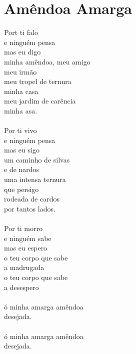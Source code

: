 \documentclass{article}
\begin{document}
\section{ Amêndoa Amarga}
Port ti falo\\
e ninguém pensa\\
mas eu digo\\
minha amêndoa, meu amigo\\
meu irmão\\
meu tropel de ternura\\
minha casa\\
meu jardim de carência\\
minha asa.\\
\\
Por ti vivo\\
e ninguém pensa\\
mas eu sigo\\
um caminho de silvas\\
e de nardos\\
uma intensa ternura\\
que persigo\\
rodeada de cardos\\
por tantos lados.\\
\\
Por ti morro\\
e ninguém sabe\\
mas eu espero \\
o teu corpo que sabe \\
a madrugada\\
o teu corpo que sabe\\
a desespero\\
\\
ó minha amarga amêndoa \\
desejada.\\
\\
ó minha amarga amêndoa\\
desejada.\\
\\
\end{document}
